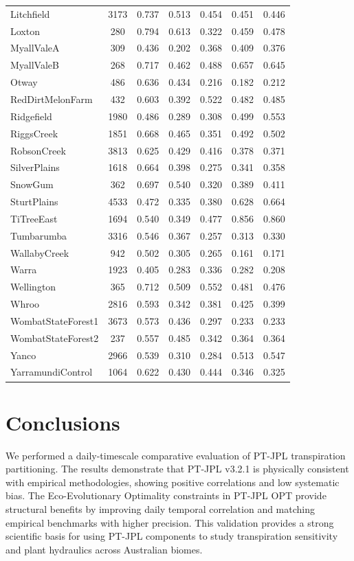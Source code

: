 \documentclass[11pt,a4paper]{article}
\begin{document}
\begin{longtable}{lcccccc}
  Litchfield & 3173 & 0.737 & 0.513 & 0.454 & 0.451 & 0.446 \\
  Loxton & 280 & 0.794 & 0.613 & 0.322 & 0.459 & 0.478 \\
  MyallValeA & 309 & 0.436 & 0.202 & 0.368 & 0.409 & 0.376 \\
  MyallValeB & 268 & 0.717 & 0.462 & 0.488 & 0.657 & 0.645 \\
  Otway & 486 & 0.636 & 0.434 & 0.216 & 0.182 & 0.212 \\
  RedDirtMelonFarm & 432 & 0.603 & 0.392 & 0.522 & 0.482 & 0.485 \\
  Ridgefield & 1980 & 0.486 & 0.289 & 0.308 & 0.499 & 0.553 \\
  RiggsCreek & 1851 & 0.668 & 0.465 & 0.351 & 0.492 & 0.502 \\
  RobsonCreek & 3813 & 0.625 & 0.429 & 0.416 & 0.378 & 0.371 \\
  SilverPlains & 1618 & 0.664 & 0.398 & 0.275 & 0.341 & 0.358 \\
  SnowGum & 362 & 0.697 & 0.540 & 0.320 & 0.389 & 0.411 \\
  SturtPlains & 4533 & 0.472 & 0.335 & 0.380 & 0.628 & 0.664 \\
  TiTreeEast & 1694 & 0.540 & 0.349 & 0.477 & 0.856 & 0.860 \\
  Tumbarumba & 3316 & 0.546 & 0.367 & 0.257 & 0.313 & 0.330 \\
  WallabyCreek & 942 & 0.502 & 0.305 & 0.265 & 0.161 & 0.171 \\
  Warra & 1923 & 0.405 & 0.283 & 0.336 & 0.282 & 0.208 \\
  Wellington & 365 & 0.712 & 0.509 & 0.552 & 0.481 & 0.476 \\
  Whroo & 2816 & 0.593 & 0.342 & 0.381 & 0.425 & 0.399 \\
  WombatStateForest1 & 3673 & 0.573 & 0.436 & 0.297 & 0.233 & 0.233 \\
  WombatStateForest2 & 237 & 0.557 & 0.485 & 0.342 & 0.364 & 0.364 \\
  Yanco & 2966 & 0.539 & 0.310 & 0.284 & 0.513 & 0.547 \\
  YarramundiControl & 1064 & 0.622 & 0.430 & 0.444 & 0.346 & 0.325 \\
\end{longtable}

\section{Conclusions}
We performed a daily-timescale comparative evaluation of PT-JPL transpiration partitioning. The results demonstrate that PT-JPL v3.2.1 is physically consistent with empirical methodologies, showing positive correlations and low systematic bias. The Eco-Evolutionary Optimality constraints in PT-JPL OPT provide structural benefits by improving daily temporal correlation and matching empirical benchmarks with higher precision. This validation provides a strong scientific basis for using PT-JPL components to study transpiration sensitivity and plant hydraulics across Australian biomes.
\end{document}
